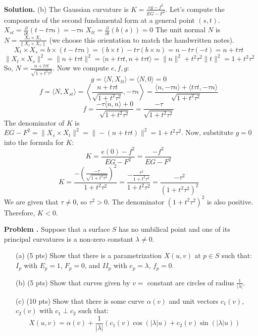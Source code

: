 \documentclass[12pt, a4paper, oneside]{article}
\newcounter{problemname}
\newenvironment{problem}
  {\begin{shaded}\stepcounter{problemname}\par\noindent\textbf{Problem \arabic{problemname}.
  }\newline}
  {\end{shaded}\par}
\newenvironment{solution}
  {\par\noindent\textbf{Solution. }\newline}
  {\par}
\begin{document}
\begin{solution}
(b) The Gaussian curvature is $K = \frac{eg - f^2}{EG - F^2}$.
Let's compute the components of the second fundamental form at a general point $(s,t)$.
$X_{st} = \frac{\partial}{\partial t}(t - t\tau n) = -\tau n$
$X_{tt} = \frac{\partial}{\partial t}(b(s)) = 0$
The unit normal $N$ is $N = \frac{X_t \times X_s}{\|X_t \times X_s\|}$ (we choose this orientation to match the handwritten notes).
\[ X_t \times X_s = b \times (t - t\tau n) = (b \times t) - t\tau (b \times n) = n - t\tau (-t) = n + t\tau t \]
\[ \|X_t \times X_s\|^2 = \|n + t\tau t\|^2 = \langle n+t\tau t, n+t\tau t \rangle = \|n\|^2 + t^2\tau^2\|t\|^2 = 1 + t^2\tau^2 \]
So, $N = \frac{n + t\tau t}{\sqrt{1 + t^2\tau^2}}$.
Now we compute $e, f, g$:
\[ g = \langle N, X_{tt} \rangle = \langle N, 0 \rangle = 0 \text{} \]
\[ f = \langle N, X_{st} \rangle = \left\langle \frac{n + t\tau t}{\sqrt{1 + t^2\tau^2}}, -\tau n \right\rangle = \frac{\langle n, -\tau n \rangle + \langle t\tau t, -\tau n \rangle}{\sqrt{1 + t^2\tau^2}} \]
\[ f = \frac{-\tau \langle n, n \rangle + 0}{\sqrt{1 + t^2\tau^2}} = \frac{-\tau}{\sqrt{1 + t^2\tau^2}} \text{} \]
The denominator of $K$ is $EG - F^2 = \|X_s \times X_t\|^2 = \|-(n + t\tau t)\|^2 = 1 + t^2\tau^2$.
Now, substitute $g=0$ into the formula for $K$:
\[ K = \frac{e(0) - f^2}{EG - F^2} = \frac{-f^2}{EG - F^2} \text{} \]
\[ K = \frac{-\left( \frac{-\tau}{\sqrt{1 + t^2\tau^2}} \right)^2}{1 + t^2\tau^2} = \frac{-\frac{\tau^2}{1 + t^2\tau^2}}{1 + t^2\tau^2} = \frac{-\tau^2}{(1 + t^2\tau^2)^2} \]
We are given that $\tau \ne 0$, so $\tau^2 > 0$. The denominator $(1 + t^2\tau^2)^2$ is also positive.
Therefore, $K < 0$.
\end{solution}

\newpage

\begin{problem}
Suppose that a surface $S$ has no umbilical point and one of its principal
curvatures is a non-zero constant $\lambda\ne0$.
\begin{itemize}
    \item[(a)] (5 pts) Show that there is a parametrization $X(u,v)$ at $p\in S$ such that:
    $I_{p}$ with $E_{p}=1$, $F_{p}=0$, and $II_{p}$ with $e_{p}=\lambda$, $f_{p}=0$.
    \item[(b)] (5 pts) Show that curves given by $v=$ constant are circles of radius $\frac{1}{|\lambda|}$.
    \item[(c)] (10 pts) Show that there is some curve $\alpha(v)$ and unit vectors $c_{1}(v)$, $c_{2}(v)$ with $c_{1}\perp c_{2}$
    such that:
    \[ X(u,v)=\alpha(v)+\frac{1}{|\lambda|}(c_{1}(v)\cos(|\lambda|u)+c_{2}(v)\sin(|\lambda|u)) \text{} \]
\end{itemize}
\end{problem}
\end{document}
